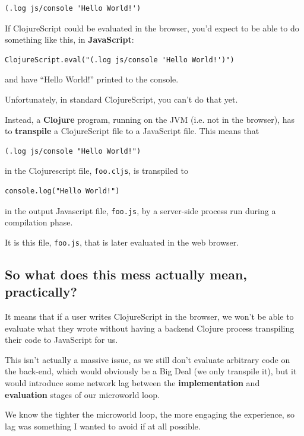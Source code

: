 \begin{verbatim}
(.log js/console 'Hello World!')
\end{verbatim}

If ClojureScript could be evaluated in the browser, you'd expect to be
able to do something like this, in \textbf{JavaScript}: 

\begin{verbatim}
ClojureScript.eval("(.log js/console 'Hello World!')") 
\end{verbatim}

and have ``Hello World!'' printed to the console.

Unfortunately, in standard ClojureScript, you can't do that yet.

Instead, a \textbf{Clojure} program, running on the JVM (i.e. not in the browser), has to \textbf{transpile} a ClojureScript file to a
JavaScript file. This means that 

\begin{verbatim}
(.log js/console "Hello World!")
\end{verbatim}

in the Clojurescript file, \texttt{foo.cljs}, is transpiled to

\begin{verbatim}
console.log("Hello World!")
\end{verbatim}

in the output Javascript file, \texttt{foo.js}, by a server-side process run during a compilation phase. 

It is this file, \texttt{foo.js}, that is later evaluated in the web browser.

\subsection{So what does this mess actually mean, practically?}

It means that if a user writes ClojureScript in the browser, we won't be
able to evaluate what they wrote without having a backend Clojure
process transpiling their code to JavaScript for us.

This isn't actually a massive issue, as we still don't evaluate
arbitrary code on the back-end, which would obviously be a Big Deal (we
only transpile it), but it would introduce some network lag
between the \textbf{implementation} and \textbf{evaluation} stages of
our microworld loop.

We know the tighter the microworld loop, the more engaging the experience, so lag was something I wanted to avoid if at all possible.

